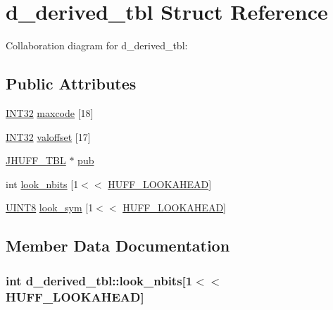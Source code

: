 \hypertarget{structd__derived__tbl}{}\section{d\+\_\+derived\+\_\+tbl Struct Reference}
\label{structd__derived__tbl}


Collaboration diagram for d\+\_\+derived\+\_\+tbl\+:
\subsection*{Public Attributes}
\begin{DoxyCompactItemize}
\item 
\hyperlink{jmorecfg_8h_a0cb58e7e6f0bad369840a52e54a56ae0}{I\+N\+T32} \hyperlink{structd__derived__tbl_a4e226d20d913f1c516bd98a930008ad1}{maxcode} \mbox{[}18\mbox{]}
\item 
\hyperlink{jmorecfg_8h_a0cb58e7e6f0bad369840a52e54a56ae0}{I\+N\+T32} \hyperlink{structd__derived__tbl_a67397b3869145321a25d2df17a0c11ec}{valoffset} \mbox{[}17\mbox{]}
\item 
\hyperlink{structJHUFF__TBL}{J\+H\+U\+F\+F\+\_\+\+T\+B\+L} $\ast$ \hyperlink{structd__derived__tbl_a816f4c07d3173cd1a96ef146acabf6c6}{pub}
\item 
int \hyperlink{structd__derived__tbl_a69e9228ebe44420f896c147bcb8b2f4b}{look\+\_\+nbits} \mbox{[}1$<$$<$ \hyperlink{jdhuff_8c_a51937b71b3fbef28d57cc49f69ec8e7d}{H\+U\+F\+F\+\_\+\+L\+O\+O\+K\+A\+H\+E\+A\+D}\mbox{]}
\item 
\hyperlink{jmorecfg_8h_adfb9a8ea1dd59f151065f763e1e9acd6}{U\+I\+N\+T8} \hyperlink{structd__derived__tbl_a526051256461864bc8395d1f6d1a82fd}{look\+\_\+sym} \mbox{[}1$<$$<$ \hyperlink{jdhuff_8c_a51937b71b3fbef28d57cc49f69ec8e7d}{H\+U\+F\+F\+\_\+\+L\+O\+O\+K\+A\+H\+E\+A\+D}\mbox{]}
\end{DoxyCompactItemize}


\subsection{Member Data Documentation}
\hypertarget{structd__derived__tbl_a69e9228ebe44420f896c147bcb8b2f4b}{}
\subsubsection[{look\+\_\+nbits}]{\setlength{\rightskip}{0pt plus 5cm}int d\+\_\+derived\+\_\+tbl\+::look\+\_\+nbits\mbox{[}1$<$$<$ {\bf H\+U\+F\+F\+\_\+\+L\+O\+O\+K\+A\+H\+E\+A\+D}\mbox{]}}\label{structd__derived__tbl_a69e9228ebe44420f896c147bcb8b2f4b}
\hypertarget{structd__derived__tbl_a526051256461864bc8395d1f6d1a82fd}{}

